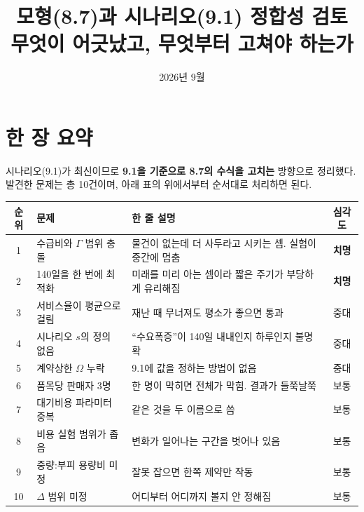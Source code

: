 \documentclass[11pt,a4paper]{article}
\title{\textbf{모형(8.7)과 시나리오(9.1) 정합성 검토}\\[5pt]
\large 무엇이 어긋났고, 무엇부터 고쳐야 하는가}
\author{}
\date{2026년 9월}
\newcommand{\hl}[1]{\textbf{\color{dblu}#1}}
\newcommand{\bad}[1]{\textbf{\color{dred}#1}}
\begin{document}
\maketitle
\vspace{-2em}

\section*{한 장 요약}

시나리오(9.1)가 최신이므로 \hl{9.1을 기준으로 8.7의 수식을 고치는} 방향으로 정리했다.
발견한 문제는 총 10건이며, 아래 표의 위에서부터 순서대로 처리하면 된다.

\begin{center}
\small
\begin{tabularx}{\textwidth}{@{}c p{} X c@{}}
\toprule
\textbf{순위} & \textbf{문제} & \textbf{한 줄 설명} & \textbf{심각도} \\
\midrule
\rowcolor{redbg} 1 & 수급비와 $\Gamma$ 범위 충돌 & 물건이 없는데 더 사두라고 시키는 셈. 실험이 중간에 멈춤 & \bad{치명} \\
\rowcolor{redbg} 2 & 140일을 한 번에 최적화 & 미래를 미리 아는 셈이라 짧은 주기가 부당하게 유리해짐 & \bad{치명} \\
\rowcolor{ambbg} 3 & 서비스율이 평균으로 걸림 & 재난 때 무너져도 평소가 좋으면 통과 & 중대 \\
\rowcolor{ambbg} 4 & 시나리오 $s$의 정의 없음 & ``수요폭증''이 140일 내내인지 하루인지 불명확 & 중대 \\
\rowcolor{ambbg} 5 & 계약상한 $\Omega$ 누락 & 9.1에 값을 정하는 방법이 없음 & 중대 \\
\midrule
\rowcolor{graybg} 6 & 품목당 판매자 3명 & 한 명이 막히면 전체가 막힘. 결과가 들쭉날쭉 & 보통 \\
\rowcolor{graybg} 7 & 대기비용 파라미터 중복 & 같은 것을 두 이름으로 씀 & 보통 \\
\rowcolor{graybg} 8 & 비용 실험 범위가 좁음 & 변화가 일어나는 구간을 벗어나 있음 & 보통 \\
\rowcolor{graybg} 9 & 중량:부피 용량비 미정 & 잘못 잡으면 한쪽 제약만 작동 & 보통 \\
\rowcolor{graybg} 10 & $\Delta$ 범위 미정 & 어디부터 어디까지 볼지 안 정해짐 & 보통 \\
\bottomrule
\end{tabularx}
\end{center}
\end{document}
